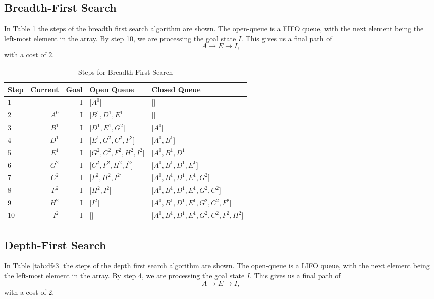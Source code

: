 \documentclass{article}
\begin{document}
\subsection{Breadth-First Search}
    In Table \ref{tab:bfs3} the steps of the breadth first search algorithm are shown. The open-queue is a FIFO queue, with the next element being the left-most element in the array.
    By step 10, we are processing the goal state $I$. This gives us a final path of
    \begin{equation}
        A \rightarrow E \rightarrow I,
    \end{equation}
    with a cost of $2$.
    \begin{table}[!htp]\centering
        \caption{Steps for Breadth First Search}\label{tab:bfs3}
        \scriptsize
        \begin{tabular}{lrrll}\toprule
        Step &Current &Goal & Open Queue &Closed Queue  \\\midrule
        1&  &I &[$A^0$] &[] \\
        2& $A^0$ &I &[$B^1, D^1, E^1$] &[] \\
        3& $B^1$ &I &[$D^1, E^1, G^2$] &[$A^0$] \\
        4& $D^1$ &I &[$E^1, G^2, C^2, F^2$] &[$A^0, B^1$] \\
        5& $E^1$ &I &[$G^2, C^2, F^2, H^2, I^2$] &[$A^0, B^1, D^1$] \\
        6& $G^2$ &I &[$C^2, F^2, H^2, I^2$] &[$A^0, B^1, D^1, E^1$] \\
        7& $C^2$ &I &[$F^2, H^2, I^2$] &[$A^0, B^1, D^1, E^1, G^2$] \\
        8& $F^2$ &I &[$H^2, I^2$] & [$A^0, B^1, D^1, E^1, G^2, C^2$]\\
        9& $H^2$ &I &[$I^2$] & [$A^0, B^1, D^1, E^1, G^2, C^2, F^2$]\\
        10& $I^2$ &I &[] & [$A^0, B^1, D^1, E^1, G^2, C^2, F^2, H^2$]\\
        \bottomrule
        \end{tabular}
    \end{table}

\subsection{Depth-First Search}
    In Table \ref{tab:dfs3} the steps of the depth first search algorithm are shown. The open-queue is a LIFO queue, with the next element being the left-most element in the array. 
    By step 4, we are processing the goal state $I$. This gives us a final path of
    \begin{equation}
        A \rightarrow E \rightarrow I,
    \end{equation}
    with a cost of $2$.
\end{document}

